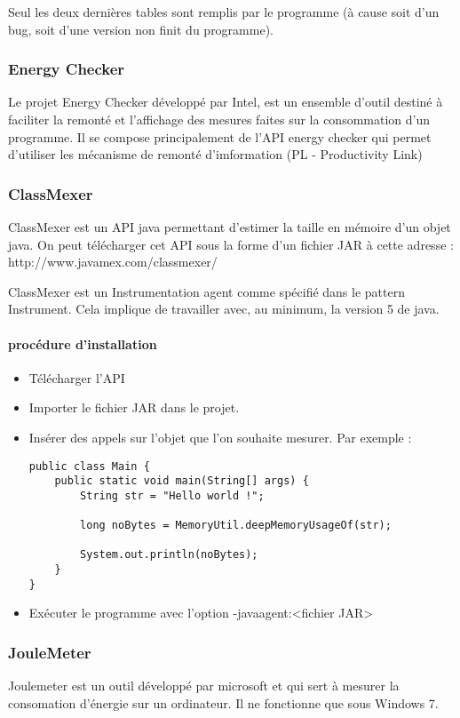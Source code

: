 \documentclass[a4paper, 11pt]{report}
\begin{document}
Seul les deux dernières tables sont remplis par le programme (à cause soit d’un bug, soit d’une version non finit du programme).

\subsubsection{Energy Checker}
Le projet Energy Checker développé par Intel, est un ensemble d’outil destiné à faciliter la remonté et l’affichage des mesures faites sur la consommation d’un programme. Il se compose principalement de l’API energy checker qui permet d’utiliser les mécanisme de remonté d’imformation (PL - Productivity Link)

\subsubsection{ClassMexer}
ClassMexer est un API java permettant d’estimer la taille en mémoire d’un objet java. On peut télécharger cet API sous la forme d’un fichier JAR à cette adresse : http://www.javamex.com/classmexer/

ClassMexer est un Instrumentation agent comme spécifié dans le pattern Instrument. Cela implique de travailler avec, au minimum, la version 5 de java.

\paragraph{procédure d'installation}
\begin{itemize}
	\item Télécharger l’API
	\item Importer le fichier JAR dans le projet.
	\item Insérer des appels sur l’objet que l’on souhaite mesurer. Par exemple :
\begin{verbatim}
public class Main {
	public static void main(String[] args) {
		String str = "Hello world !";
		
		long noBytes = MemoryUtil.deepMemoryUsageOf(str);
		
		System.out.println(noBytes);
	}
}
\end{verbatim}
	\item Exécuter le programme avec l’option -javaagent:<fichier JAR>
\end{itemize}

\subsubsection{JouleMeter}
Joulemeter est un outil développé par microsoft et qui sert à mesurer la consomation d’énergie sur un ordinateur. Il ne fonctionne que sous Windows 7.
\end{document}
